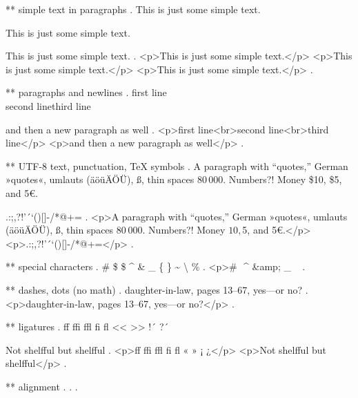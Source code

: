 ** simple text in paragraphs
.
This is just some simple text.

This is just some simple text.

This is just some simple text.
.
<p>This is just some simple text.</p>
<p>This is just some simple text.</p>
<p>This is just some simple text.</p>
.

** paragraphs and newlines
.
first line\\second line\newline third line\par and then a new paragraph as well
.
<p>ﬁrst line<br>second line<br>third line</p>
<p>and then a new paragraph as well</p>
.


** UTF-8 text, punctuation, TeX symbols
.
A para\-graph with “quotes,” German »quotes«, umlauts (äöüÄÖÜ), ß, thin spaces 80\,000. Numbers?! Money \$10, \$5, and 5€.

.:;,?!'´`()[]-/*@+=
.
<p>A paragraph with “quotes,” German »quotes«, umlauts (äöüÄÖÜ), ß, thin spaces 80 000. Numbers?! Money $10, $5, and 5€.</p>
<p>.:;,?!'´`()[]‐/*@+=</p>
.


** special characters
.
\# \$ \$ \^{} \& \_ \{ \} \~{} \textbackslash{} \%
.
<p># $ $ ^​ &amp; _ { } ~​ \​ %
.


** dashes, dots (no math)
.
daughter-in-law, pages 13--67, yes---or no?
.
<p>daughter‐in‐law, pages 13–67, yes—or no?</p>
.


** ligatures
.
ff ffi ffl fi fl << >> !´ ?´

Not shelfful but shelf\mbox{}ful
.
<p>ﬀ ﬃ ﬄ ﬁ ﬂ « » ¡ ¿</p>
<p>Not shelﬀul but shelfful</p>
.



** alignment
.
.
.
